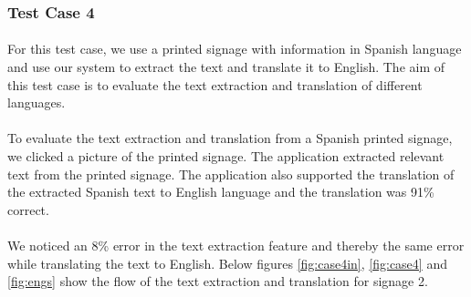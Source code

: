 \documentclass[12pt]{article}
\begin{document}
\subsubsection{Test Case 4}
\label{threefour}
\paragraph{}For this test case, we use a printed signage with information in Spanish language and use our system to extract the text and translate it to English. The aim of this test case is to evaluate the text extraction and translation of different languages. 

\paragraph{}To evaluate the text extraction and translation from a Spanish printed signage, we clicked a picture of the printed signage. The application extracted relevant text from the printed signage. The application also supported the translation of the extracted Spanish text to English language and the translation was 91\% correct.

\paragraph{}We noticed an 8\% error in the text extraction feature and thereby the same error while translating the text to English. Below figures \ref{fig:case4in}, \ref{fig:case4} and \ref{fig:engs} show the flow of the text extraction and translation for signage 2.
\end{document}
